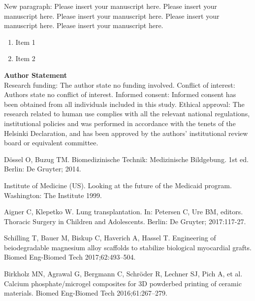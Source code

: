 \documentclass[USenglish,twocolumn]{article}
\begin{document}
  New paragraph: Please insert your manuscript here. Please insert your manuscript here. Please insert your manuscript here. Please insert your manuscript here. Please insert your manuscript here.

  \begin{enumerate}
    \item Item 1
    \item Item 2
  \end{enumerate}


  \textsf{\textbf{Author Statement}}\\
  Research funding: The author state no funding involved. Conflict of interest: Authors state no conflict of interest. Informed consent: Informed consent has been obtained from all individuals included in this study. Ethical approval: The research related to human use complies with all the relevant national regulations, institutional policies and was performed in accordance with the tenets of the Helsinki Declaration, and has been approved by the authors' institutional review board or equivalent committee.


  \begin{thebibliography}{99}

    Dössel O, Buzug TM. Biomedizinische Technik: Medizinische Bildgebung. 1st ed. Berlin: De Gruyter; 2014.

    Institute of Medicine (US). Looking at the future of the Medicaid
    program. Washington: The Institute 1999.

    Aigner C, Klepetko W. Lung transplantation. In: Petersen C, Ure BM, editors. Thoracic Surgery in Children and Adolescents. Berlin: De Gruyter; 2017:117-27.

    Schilling T, Bauer M, Biskup C, Haverich A, Hassel T. Engineering of beiodegradable magnesium alloy scaffolds to stabilize biological myocardial grafts. Biomed Eng-Biomed Tech 2017;62:493–504.

    Birkholz MN, Agrawal G, Bergmann C, Schröder R, Lechner SJ, Pich A, et al. Calcium phosphate/microgel composites for 3D powderbed printing of ceramic materials. Biomed Eng-Biomed Tech 2016;61:267–279.
  \end{thebibliography}
\end{document}
